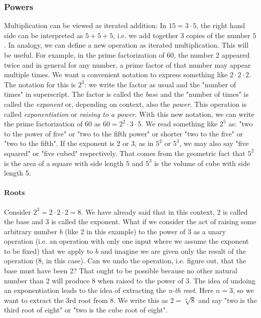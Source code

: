 \subsubsection{Powers}
Multiplication can be viewed as iterated addition: In $15 = 3 \cdot 5$, the right hand side can be interpreted as $5 + 5 + 5$, i.e. we add together $3$ copies of the number $5$. In analogy, we can define a new operation as iterated multiplication. This will be useful. For example, in the prime factorization of 60, the number 2 appeared twice and in general for any number, a prime factor of that number may appear multiple times. We want a convenient notation to express something like $2 \cdot 2 \cdot 2$. The notation for this is $2^3$: we write the factor as usual and the "number of times" in superscript. The factor is called the \emph{base} and the "number of times" is called the \emph{exponent} or, depending on context, also the \emph{power}. This operation is called \emph{exponentiation} or \emph{raising to a power}. With this new notation, we can write the prime factorization of 60 as $60 = 2^2 \cdot 3 \cdot 5$.  We read something like $2^5$ as: "two to the power of five" or "two to the fifth power" or shorter "two to the five" or "two to the fifth". If the exponent is 2 or 3, as in $5^2$ or $5^3$, we may also say "five squared" or "five cubed" respectively. That comes from the geometric fact that $5^2$ is the area of a square with side length $5$ and $5^3$ is the volume of cube with side length 5.

\paragraph{Roots}
Consider $2^3 = 2 \cdot 2 \cdot 2 = 8$. We have already said that in this context, 2 is called the base and 3 is called the exponent. What if we consider the act of raising some arbitrary number $b$ (like 2 in this example) to the power of 3 as a unary operation (i.e. an operation with only one input where we assume the exponent to be fixed) that we apply to $b$ and imagine we are given only the result of the operation (8, in this case). Can we undo the operation, i.e. figure out, that the base must have been 2? That ought to be possible because no other natural number than 2 will produce 8 when raised to the power of 3. The idea of undoing an exponentiation leads to the idea of extracting the \emph{n-th root}. Here $n = 3$, so we want to extract the 3rd root from 8. We write this as $2 =\sqrt[3]{8}$ and say "two is the third root of eight" or "two is the cube root of eight".

